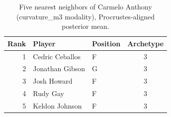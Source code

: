 \begin{table}[htbp]
  \centering\small
  \begin{tabular}{rllc}
    \toprule
    Rank & Player & Position & Archetype \\
    \midrule
    1 & Cedric Ceballos & F & 3 \\
    2 & Jonathan Gibson & G & 3 \\
    3 & Josh Howard & F & 3 \\
    4 & Rudy Gay & F & 3 \\
    5 & Keldon Johnson & F & 3 \\
    \bottomrule
  \end{tabular}
  \caption{Five nearest neighbors of Carmelo Anthony (curvature_m3 modality), Procrustes-aligned posterior mean.}
  \label{tab:Carmelo_Anthony_neighbors_curvature_m3}
\end{table}

